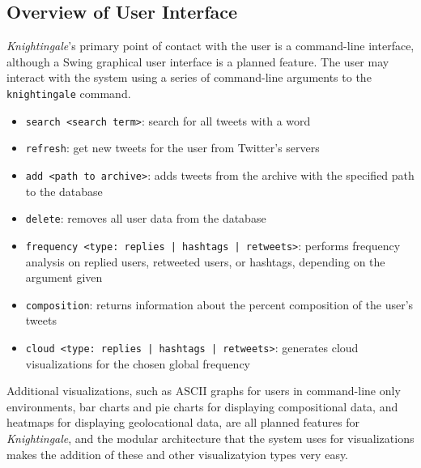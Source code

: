 \documentclass[a4paper, 12pt]{article}
\begin{document}
\subsection{Overview of User Interface} \label{sec:ui}
\begin{adjustwidth}{2em}{0pt}
\textit{Knightingale}'s primary point of contact with the user is a command-line interface, although a Swing graphical user interface is a planned feature. The user may interact with the system using a series of command-line arguments to the \texttt{knightingale} command.
\begin{itemize}
\item \texttt{search <search term>}: search for all tweets with a word
\item \texttt{refresh}: get new tweets for the user from Twitter's servers
\item \texttt{add <path to archive>}: adds tweets from the archive with the specified path to the database
\item \texttt{delete}: removes all user data from the database
\item \texttt{frequency <type: replies | hashtags | retweets>}: performs frequency analysis on replied users, retweeted users, or hashtags, depending on the argument given
\item \texttt{composition}: returns information about the percent composition of the user's tweets
\item \texttt{cloud <type: replies | hashtags | retweets>}: generates cloud visualizations for the chosen global frequency
\end{itemize}
Additional visualizations, such as ASCII graphs for users in command-line only environments, bar charts and pie charts for displaying compositional data, and heatmaps for displaying geolocational data, are all planned features for \textit{Knightingale}, and the modular architecture that the system uses for visualizations makes the addition of these and other visualizatyion types very easy.
\end{adjustwidth}
\end{document}
